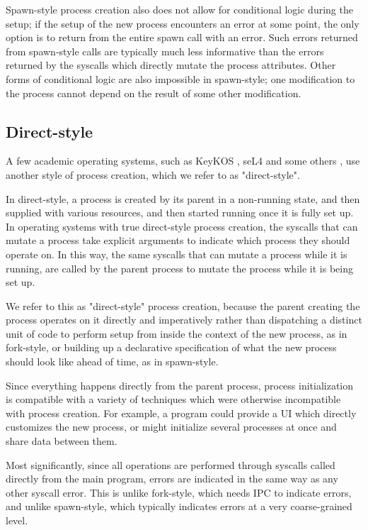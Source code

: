\documentclass{acmart}
\begin{document}
Spawn-style process creation also does not allow for conditional logic during the setup;
if the setup of the new process encounters an error at some point,
the only option is to return from the entire spawn call with an error.
Such errors returned from spawn-style calls
are typically much less informative
than the errors returned by the syscalls which directly mutate the process attributes.
Other forms of conditional logic are also impossible in spawn-style;
one modification to the process cannot depend on the result of some other modification.
\subsection{Direct-style}
A few academic operating systems, such as KeyKOS \cite{keykos}, seL4 \cite{sel4}
and some others \cite{exokernel} \cite{fuschia} \cite{singularity},
use another style of process creation, which we refer to as "direct-style".

In direct-style, a process is created by its parent in a non-running state,
and then supplied with various resources,
and then started running once it is fully set up.
In operating systems with true direct-style process creation,
the syscalls that can mutate a process
take explicit arguments to indicate which process they should operate on.
In this way, the same syscalls that can mutate a process while it is running,
are called by the parent process to mutate the process while it is being set up.

We refer to this as "direct-style" process creation,
because the parent creating the process operates on it directly and imperatively
rather than dispatching a distinct unit of code to perform setup from inside the context of the new process,
as in fork-style,
or building up a declarative specification of what the new process should look like ahead of time,
as in spawn-style.

Since everything happens directly from the parent process,
process initialization is compatible with a variety of techniques
which were otherwise incompatible with process creation.
For example, a program could provide a UI which directly customizes the new process,
or might initialize several processes at once and share data between them.

Most significantly,
since all operations are performed through syscalls called directly from the main program,
errors are indicated in the same way as any other syscall error.
This is unlike fork-style, which needs IPC to indicate errors,
and unlike spawn-style, which typically indicates errors at a very coarse-grained level.
\end{document}
